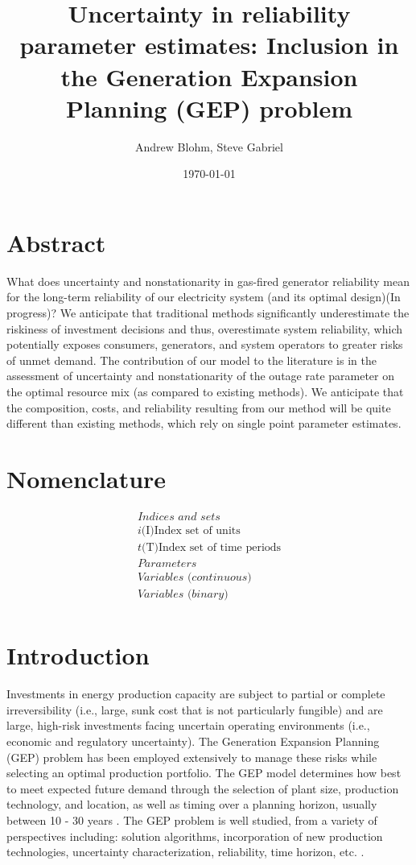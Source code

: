 \documentclass[10pt]{amsart}
\title{Uncertainty in reliability parameter estimates: Inclusion in the Generation Expansion Planning (GEP) problem}
\author{Andrew Blohm, Steve Gabriel}
\date{\today}
\begin{document}
\maketitle

\section{Abstract}
What does uncertainty and nonstationarity in gas-fired generator reliability mean for the long-term reliability of our electricity system (and its optimal design)(In progress)? 
We anticipate that traditional methods significantly underestimate the riskiness of investment decisions and thus, overestimate system reliability, which potentially exposes consumers, generators, and system operators to greater risks of unmet demand. 
The contribution of our model to the literature is in the assessment of uncertainty and nonstationarity of the outage rate parameter on the optimal resource mix (as compared to existing methods). 
We anticipate that the composition, costs, and reliability resulting from our method will be quite different than existing methods, which rely on single point parameter estimates. 

\section{Nomenclature}
\begin{equation*}
\begin{split}
\textit{Indices and sets} \\
\textit{i} \text{(I)} \text{Index set of units} \\
\textit{t} \text{(T)} \text{Index set of time periods} \\
\textit{Parameters} \\
\textit{Variables (continuous)} \\
\textit{Variables (binary)} \\
\end{split}
\end{equation*}

\section{Introduction}
Investments in energy production capacity are subject to partial or complete irreversibility (i.e., large, sunk cost that is not particularly fungible) and are large, high-risk investments facing uncertain operating environments (i.e., economic and regulatory uncertainty)\parencite{bakirtzis:2012aa}. 
The Generation Expansion Planning (GEP) problem has been employed extensively to manage these risks while selecting an optimal production portfolio. 
The GEP model determines how best to meet expected future demand through the selection of plant size, production technology, and location, as well as timing over a planning horizon, usually between 10 - 30 years \parencite{hemmati:2013ab}. 
The GEP problem is well studied, from a variety of perspectives including: solution algorithms, incorporation of new production technologies, uncertainty characterization, reliability, time horizon, etc. \parencite{hemmati:2013ab}.
\end{document}

